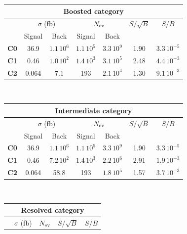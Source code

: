 \begin{table}[t]
  \centering
  \begin{tabular}{c|c|c||c|c||c|c}
    \hline
    \multicolumn{7}{c}{Boosted category}\\
    \hline
    \hline
    &    \multicolumn{2}{c||}{$\sigma$ (fb)}   &  \multicolumn{2}{c||}{$N_{\rm ev}$}
    &   $S/\sqrt{B}$  & $S/B$\\
      &    Signal & Back   &  Signal  & Back
    &   & \\
    \hline
        {\bf C0}  &  36.9  & $1.1\,10^{6}$ & $1.1\,10^5$ & $3.3\,10^{9}$  &  1.90 & $3.3\,10^{-5}$\\
        {\bf C1}  &  0.46    & $1.0\,10^2$    &  $1.4\,10^3$   & $3.1\,10^5$     & 2.48     &  $4.4\,10^{-3}$ \\
        {\bf C2}  &  0.064     &  7.1     &  193   &  $2.1\,10^4$    &  1.30    &  $9.1\,10^{-3}$ \\
        \hline
  \end{tabular}
   $\,$\\
  \vspace{0.4cm}
  \begin{tabular}{c|c|c|c|c|c|c}
    \hline
    \multicolumn{7}{c}{Intermediate category}\\
    \hline
    \hline
    &    \multicolumn{2}{c|}{$\sigma$ (fb)}   &  \multicolumn{2}{c|}{$N_{\rm ev}$}
    &   $S/\sqrt{B}$  & $S/B$\\
      &    Signal & Back   &  Signal  & Back
    &   & \\
    \hline
 {\bf C0}  &  36.9  & $1.1\,10^{6}$ & $1.1\,10^5$ & $3.3\,10^{9}$  &  1.90 & $3.3\,10^{-5}$\\
        {\bf C1}  &  0.46    & $7.2\,10^2$    &  $1.4\,10^3$   & $2.2\,10^6$     & 2.91     &  $1.9\,10^{-3}$ \\
        {\bf C2}  &  0.064     &  58.8     &  193   &  $1.8\,10^5$    &  1.57    &  $3.7\,10^{-3}$ \\
        \hline
  \end{tabular}
  $\,$\\
  \vspace{0.4cm}
  \noindent
  \begin{tabular}{c|c|c|c|c|c|c}
    \hline
    \multicolumn{7}{c}{Resolved category}\\
    \hline
    \hline
    &    \multicolumn{2}{c|}{$\sigma$ (fb)}   &  \multicolumn{2}{c|}{$N_{\rm ev}$}
    &   $S/\sqrt{B}$  & $S/B$\\

\end{tabular}
\end{table}
